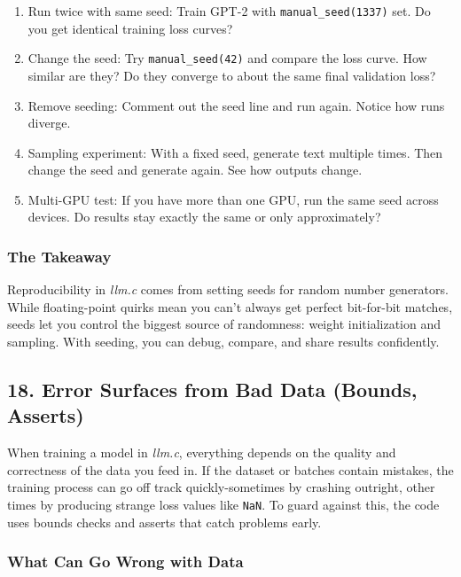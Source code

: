\documentclass[
  letterpaper,
  DIV=11,
  numbers=noendperiod]{scrreprt}
\providecommand{\tightlist}{%
  \setlength{\itemsep}{0pt}\setlength{\parskip}{0pt}}
\begin{document}
\begin{enumerate}
\def\labelenumi{\arabic{enumi}.}
\tightlist
\item
  Run twice with same seed: Train GPT-2 with \texttt{manual\_seed(1337)}
  set. Do you get identical training loss curves?
\item
  Change the seed: Try \texttt{manual\_seed(42)} and compare the loss
  curve. How similar are they? Do they converge to about the same final
  validation loss?
\item
  Remove seeding: Comment out the seed line and run again. Notice how
  runs diverge.
\item
  Sampling experiment: With a fixed seed, generate text multiple times.
  Then change the seed and generate again. See how outputs change.
\item
  Multi-GPU test: If you have more than one GPU, run the same seed
  across devices. Do results stay exactly the same or only
  approximately?
\end{enumerate}

\subsubsection{The Takeaway}\label{the-takeaway-6}

Reproducibility in \emph{llm.c} comes from setting seeds for random
number generators. While floating-point quirks mean you can't always get
perfect bit-for-bit matches, seeds let you control the biggest source of
randomness: weight initialization and sampling. With seeding, you can
debug, compare, and share results confidently.

\subsection{18. Error Surfaces from Bad Data (Bounds,
Asserts)}\label{error-surfaces-from-bad-data-bounds-asserts}

When training a model in \emph{llm.c}, everything depends on the quality
and correctness of the data you feed in. If the dataset or batches
contain mistakes, the training process can go off track
quickly-sometimes by crashing outright, other times by producing strange
loss values like \texttt{NaN}. To guard against this, the code uses
bounds checks and asserts that catch problems early.

\subsubsection{What Can Go Wrong with
Data}\label{what-can-go-wrong-with-data}
\end{document}
